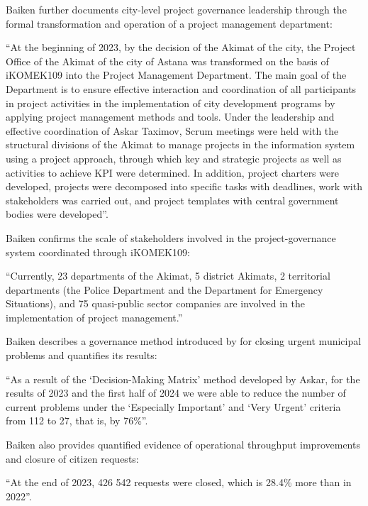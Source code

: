 Baiken further documents \mrls city-level project governance leadership through the formal transformation and operation of a project management department:
\begin{fullquote}
``At the beginning of 2023, by the decision of the Akimat of the city, the Project Office of the Akimat of the city of Astana was transformed on the basis of iKOMEK109 into the Project Management Department. The main goal of the Department is to ensure effective interaction and coordination of all participants in project activities in the implementation of city development programs by applying project management methods and tools. Under the leadership and effective coordination of Askar Taximov, Scrum meetings were held with the structural divisions of the Akimat to manage projects in the information system using a project approach, through which key and strategic projects as well as activities to achieve KPI were determined. In addition, project charters were developed, projects were decomposed into specific tasks with deadlines, work with stakeholders was carried out, and project templates with central government bodies were developed''.
\end{fullquote}

Baiken confirms the scale of stakeholders involved in the project-governance system coordinated through iKOMEK109:
\begin{fullquote}
``Currently, 23 departments of the Akimat, 5 district Akimats, 2 territorial departments (the Police Department and the Department for Emergency Situations), and 75 quasi-public sector companies are involved in the implementation of project management.''
\end{fullquote}

Baiken describes a governance method introduced by \mrl{} for closing urgent municipal problems and quantifies its results:
\begin{fullquote}
``As a result of the `Decision-Making Matrix' method developed by Askar, for the results of 2023 and the first half of 2024 we were able to reduce the number of current problems under the `Especially Important' and `Very Urgent' criteria from 112 to 27, that is, by 76\%''.
\end{fullquote}

Baiken also provides quantified evidence of operational throughput improvements and closure of citizen requests:
\begin{fullquote}
``At the end of 2023, 426 542 requests were closed, which is 28.4\% more than in 2022''.
\end{fullquote}

